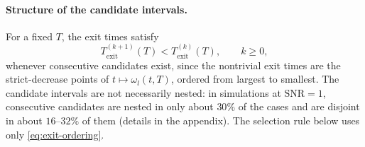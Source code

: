 \documentclass[12pt,a4paper]{article}
\begin{document}
\paragraph{Structure of the candidate intervals.}
For a fixed \(T\), the exit times satisfy
\begin{equation}
	T_{\mathrm{exit}}^{(k+1)}(T)
	<
	T_{\mathrm{exit}}^{(k)}(T),
	\qquad k \geq 0,
	\label{eq:exit-ordering}
\end{equation}
whenever consecutive candidates exist, since the nontrivial exit times are the strict-decrease points of \(t \mapsto \omega_l(t,T)\), ordered from largest to smallest. The candidate intervals are not necessarily nested: in simulations at \(\mathrm{SNR}=1\), consecutive candidates are nested in only about \(30\%\) of the cases and are disjoint in about \(16\)--\(32\%\) of them (details in the appendix). The selection rule below uses only \eqref{eq:exit-ordering}.
\end{document}
